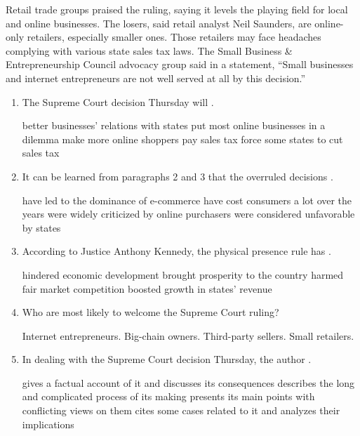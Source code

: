  Retail trade
groups praised the ruling, saying it levels the playing field for local
and online businesses. The losers, said retail analyst Neil Saunders,
are online-only retailers, especially smaller ones. Those retailers may
face headaches complying with various state sales tax laws. The Small
Business \& Entrepreneurship Council advocacy group said in a statement,
``Small businesses and internet entrepreneurs are not well served at all
by this decision.''

\begin{enumerate}[resume]
	\item
The Supreme Court decision Thursday will \lineread.


\fourchoices
{better businesses' relations with states}
{put most online businesses in a dilemma}
{make more online shoppers pay sales tax}
{force some states to cut sales tax}

\item
It can be learned from paragraphs 2 and 3 that the overruled
decisions \lineread.


\fourchoices
{have led to the dominance of e-commerce}
{have cost consumers a lot over the years}
{were widely criticized by online purchasers}
{were considered unfavorable by states}


\item
According to Justice Anthony Kennedy, the physical presence rule has \lineread.



\fourchoices
{hindered economic development}
{brought prosperity to the country}
{harmed fair market competition}
{boosted growth in states' revenue}



\item
Who are most likely to welcome the Supreme Court ruling?

\fourchoices
{Internet entrepreneurs.}
{Big-chain owners.}
{Third-party sellers.}
{Small retailers.}



\item
In dealing with the Supreme Court decision Thursday, the author \lineread.

\fourchoices
{gives a factual account of it and discusses its consequences}
{describes the long and complicated process of its making}
{presents its main points with conflicting views on them}
{cites some cases related to it and analyzes their implications}

\end{enumerate}



